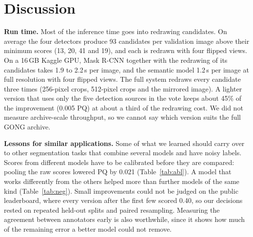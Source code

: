 \documentclass[conference]{IEEEtran}
\begin{document}
\section{Discussion}
\label{sec:discussion}
\textbf{Run time.} Most of the inference time goes into redrawing candidates. On average the four detectors produce 93 candidates per validation image above their minimum scores (13, 20, 41 and 19), and each is redrawn with four flipped views. On a 16\,GB Kaggle GPU, Mask R-CNN together with the redrawing of its candidates takes 1.9 to 2.2\,s per image, and the semantic model 1.2\,s per image at full resolution with four flipped views. The full system redraws every candidate three times (256-pixel crops, 512-pixel crops and the mirrored image). A lighter version that uses only the five detection sources in the vote keeps about 45\% of the improvement (0.005 PQ) at about a third of the redrawing cost. We did not measure archive-scale throughput, so we cannot say which version suits the full GONG archive.

\textbf{Lessons for similar applications.} Some of what we learned should carry over to other segmentation tasks that combine several models and have noisy labels. Scores from different models have to be calibrated before they are compared: pooling the raw scores lowered PQ by 0.021 (Table~\ref{tab:abl}). A model that works differently from the others helped more than further models of the same kind (Table~\ref{tab:neg}). Small improvements could not be judged on the public leaderboard, where every version after the first few scored 0.40, so our decisions rested on repeated held-out splits and paired resampling. Measuring the agreement between annotators early is also worthwhile, since it shows how much of the remaining error a better model could not remove.
\end{document}
